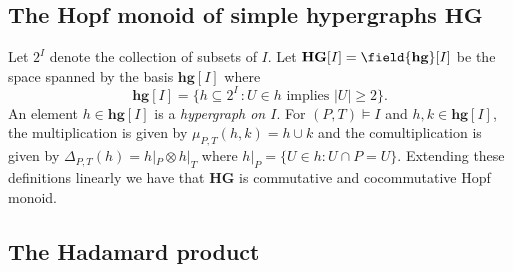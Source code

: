 \subsection{The Hopf monoid of simple hypergraphs \texorpdfstring{$\mathbf{HG}$}{HG}}\label{ss:hypergraph}

Let $2^I$ denote the collection of subsets of $I$. Let $\mathbf{HG} [I]=\field {\mathbf{hg}} [I]$ be the space spanned by the basis $\mathbf{hg} [I]$ where
 $$\mathbf{hg}[I]=\big\{h \subseteq 2^I\,: U\in h\text{ implies }|U|\ge 2\big\}.$$
An element $h\in\mathbf{hg}[I]$ is a \emph{hypergraph on $I$}.
For $(P,T)\models I$ and $h,k\in \mathbf{hg}[I]$, the multiplication is given by $\mu_{P,T}(h,k)=h\cup k$ and the comultiplication 
is given by $\Delta_{P,T}(h) = h |_P\otimes h |_T$ where $h |_P=\{U\in h : U\cap P = U\}$. Extending these definitions linearly we have that $\mathbf{HG}$ is 
commutative and cocommutative Hopf monoid. 

%

\subsection{The Hadamard product}\label{ss:hadamard}


